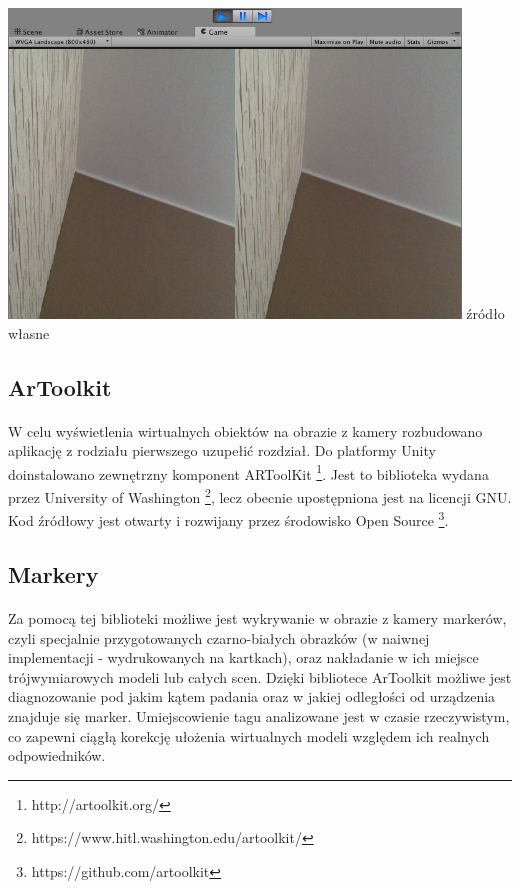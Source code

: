 \documentclass[12pt]{article}
\begin{document}
{{\begin{center}
\includegraphics[width=0.9\textwidth]{images/kadr.jpg}
\small {źródło własne}
\end{center}

\subsection{ArToolkit}
\paragraph{}
W celu wyświetlenia wirtualnych obiektów na obrazie z kamery rozbudowano aplikację z rodziału pierwszego {\color{red}uzupełić rozdział}. Do platformy Unity doinstalowano zewnętrzny komponent ARToolKit  \footnote{http://artoolkit.org/}. Jest to biblioteka wydana przez University of Washington \footnote{https://www.hitl.washington.edu/artoolkit/}, lecz obecnie upostępniona jest na licencji GNU. Kod źródłowy jest otwarty i rozwijany przez środowisko Open Source \footnote{https://github.com/artoolkit}.
\subsection{Markery}
\paragraph{}
Za pomocą tej biblioteki możliwe jest wykrywanie w obrazie z kamery markerów, czyli specjalnie przygotowanych czarno-białych obrazków (w naiwnej implementacji - wydrukowanych na kartkach), oraz nakładanie w ich miejsce trójwymiarowych modeli lub całych scen. Dzięki bibliotece ArToolkit możliwe jest diagnozowanie pod jakim kątem padania oraz w jakiej odległości od urządzenia znajduje się marker. Umiejscowienie tagu analizowane jest w czasie rzeczywistym, co zapewni ciągłą korekcję ułożenia wirtualnych modeli względem ich realnych odpowiedników.

}}
\end{document}
